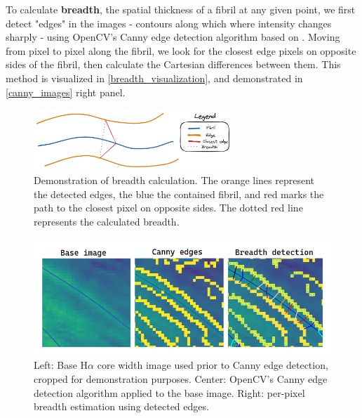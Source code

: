 \documentclass{iau}
\begin{document}
To calculate \textbf{breadth}, the spatial thickness of a fibril at any given point, we first detect "edges" in the images - contours along which where intensity changes sharply - using OpenCV's Canny edge detection algorithm based on \citet{1986CaJh}. Moving from pixel to pixel along the fibril, we look for the closest edge pixels on opposite sides of the fibril, then calculate the Cartesian differences between them. This method is visualized in \autoref{breadth_visualization}, and demonstrated in \autoref{canny_images} right panel. 

\begin{figure}[h]
    \begin{center}
    \includegraphics[width=7.5cm]{breadth_visualization.png} 
    \end{center}
    \caption{Demonstration of breadth calculation. The orange lines represent the detected edges, the blue the contained fibril, and red marks the path to the closest pixel on opposite sides. The dotted red line represents the calculated breadth.} \label{breadth_visualization}
\end{figure}


\begin{figure}[h]
    \begin{center}
    \includegraphics[width=12cm]{canny_section.png} 
     \caption{Left: Base H$\alpha$ core width image used prior to Canny edge detection, cropped for demonstration purposes. Center: OpenCV's Canny edge detection algorithm applied to the base image. Right: per-pixel breadth estimation using detected edges.} \label{canny_images}
    \end{center}
\end{figure}
\end{document}
